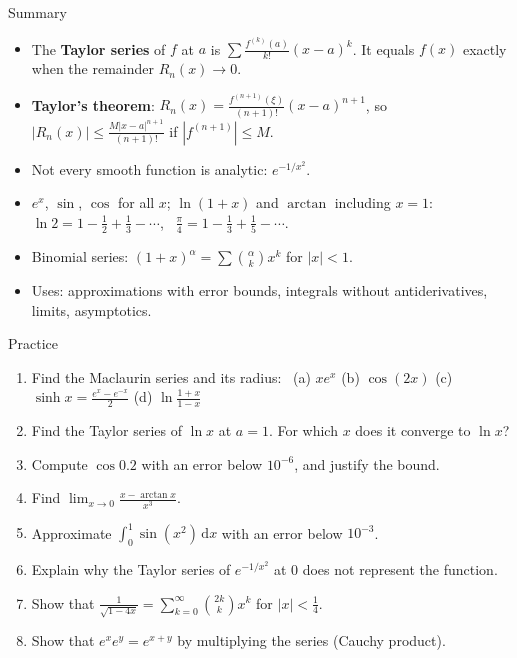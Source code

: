 \documentclass{wosm-slides}
\newcommand{\dx}{\,\mathrm{d}x}
\begin{document}
\begin{frame}{Summary}
  \begin{itemize}
    \item The \textbf{Taylor series} of $f$ at $a$ is $\sum \frac{f^{(k)}(a)}{k!}(x - a)^k$.
      It equals $f(x)$ exactly when the remainder $R_n(x) \to 0$.
    \item \textbf{Taylor's theorem}: $R_n(x) = \frac{f^{(n+1)}(\xi)}{(n+1)!}(x - a)^{n+1}$, so
      $|R_n(x)| \le \frac{M |x - a|^{n+1}}{(n+1)!}$ if $|f^{(n+1)}| \le M$.
    \item Not every smooth function is analytic: $e^{-1/x^2}$.
    \item $e^x$, $\sin$, $\cos$ for all $x$; $\ln(1+x)$ and $\arctan$ including $x = 1$:
      $\ln 2 = 1 - \frac12 + \frac13 - \cdots$, \ $\frac\pi4 = 1 - \frac13 + \frac15 - \cdots$.
    \item Binomial series: $(1 + x)^\alpha = \sum \binom{\alpha}{k} x^k$ for $|x| < 1$.
    \item Uses: approximations with error bounds, integrals without antiderivatives,
      limits, asymptotics.
  \end{itemize}
\end{frame}

\begin{frame}{Practice}
  \small
  \begin{enumerate}
    \item Find the Maclaurin series and its radius: \
      (a) $x e^x$ \quad (b) $\cos(2x)$ \quad (c) $\sinh x = \frac{e^x - e^{-x}}{2}$ \quad
      (d) $\ln\frac{1+x}{1-x}$
    \item Find the Taylor series of $\ln x$ at $a = 1$. For which $x$ does it converge to $\ln x$?
    \item Compute $\cos 0.2$ with an error below $10^{-6}$, and justify the bound.
    \item Find $\displaystyle\lim_{x\to0} \frac{x - \arctan x}{x^3}$.
    \item Approximate $\int_0^1 \sin(x^2)\dx$ with an error below $10^{-3}$.
    \item Explain why the Taylor series of $e^{-1/x^2}$ at $0$ does not represent the function.
    \item Show that $\frac{1}{\sqrt{1 - 4x}} = \sum_{k=0}^\infty \binom{2k}{k} x^k$ for $|x| < \frac14$.
    \item Show that $e^{x}e^{y} = e^{x+y}$ by multiplying the series (Cauchy product).
  \end{enumerate}
\end{frame}
\end{document}
